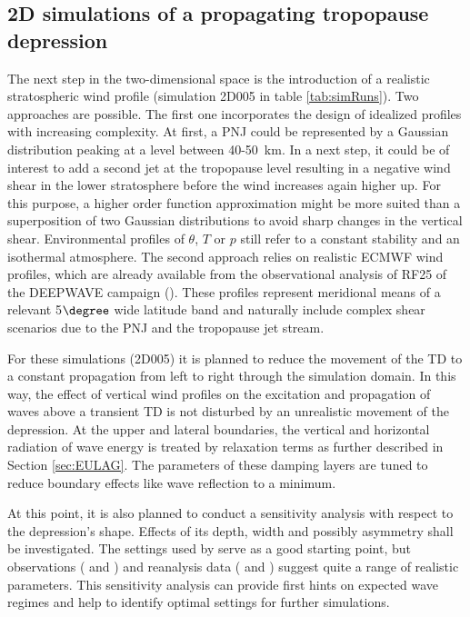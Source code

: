 \subsection{2D simulations of a propagating tropopause depression}
\label{sec:2D}

The next step in the two-dimensional space is the introduction of a realistic stratospheric wind profile (simulation 2D005 in table \ref{tab:simRuns}). Two approaches are possible. The first one incorporates the design of idealized profiles with increasing complexity. At first, a PNJ could be represented by a Gaussian distribution peaking at a level between 40-\SI{50}{\kilo\meter}. In a next step, it could be of interest to add a second jet at the tropopause level resulting in a negative wind shear in the lower stratosphere before the wind increases again higher up. For this purpose, a higher order function approximation might be more suited than a superposition of two Gaussian distributions to avoid sharp changes in the vertical shear. Environmental profiles of $\theta$, $T$ or $p$ still refer to a constant stability and an isothermal atmosphere. The second approach relies on realistic ECMWF wind profiles, which are already available from the observational analysis of RF25 of the DEEPWAVE campaign (\cite{dornbrack_stratospheric_2021}). These profiles represent meridional means of a relevant 5$\degree$ wide latitude band and naturally include complex shear scenarios due to the PNJ and the tropopause jet stream. 

For these simulations (2D005) it is planned to reduce the movement of the TD to a constant propagation from left to right through the simulation domain. In this way, the effect of vertical wind profiles on the excitation and propagation of waves above a transient TD is not disturbed by an unrealistic movement of the depression. At the upper and lateral boundaries, the vertical and horizontal radiation of wave energy is treated by relaxation terms as further described in Section \ref{sec:EULAG}. The parameters of these damping layers are tuned to reduce boundary effects like wave reflection to a minimum.

At this point, it is also planned to conduct a sensitivity analysis with respect to the depression's shape. Effects of its depth, width and possibly asymmetry shall be investigated. The settings used by \textcite{prusa_all-scale_2003} serve as a good starting point, but observations (\cite{bush_tropopause_1994} and \cite{keyser_review_1986}) and reanalysis data (\cite{dornbrack_stratospheric_2021} and \cite{skerlak_tropopause_2015}) suggest quite a range of realistic parameters. This sensitivity analysis can provide first hints on expected wave regimes and help to identify optimal settings for further simulations.

